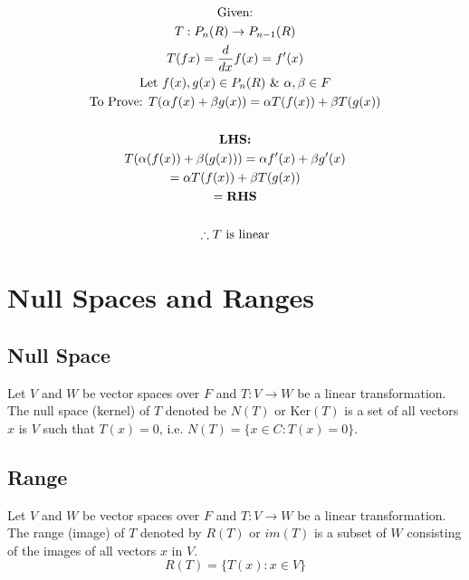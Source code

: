 \documentclass[english,course,fleqn]{lecture}
\newenvironment{qanda}{\begin{enumerate}\setlength{\parindent}{0pt}}{\medskip\end{enumerate}}
\begin{document}
\begin{qanda}
  \begin{gather*}
    \text{Given:}\\
    T:P_{n}(R) \rightarrow P_{n-1}(R)\\
    T(f{x}) = \frac{d}{dx}{f(x)} = f'(x)\\
    \text{Let } f(x), g(x) \in P_{n}(R) ~\&~ \alpha, \beta \in F\\
    \text{To Prove: } T(\alpha f(x) + \beta g(x)) = \alpha T(f(x)) + \beta T(g(x))\\
    \\
    \text{\textbf{LHS:}}\\
    T(\alpha(f(x)) + \beta (g(x))) = \alpha f'(x) + \beta g'(x)\\
    = \alpha T(f(x)) + \beta T(g(x))\\
    = \text{\textbf{RHS}}\\
    \\
    \therefore \text{$T$ is linear}
  \end{gather*}
\end{qanda}

\newpage

\section{Null Spaces and Ranges}

\subsection{Null Space}

\begin{definition}
  Let $V$ and $W$ be vector spaces over $F$ and $T:V\rightarrow W$ be a linear transformation.
  The null space (kernel) of $T$ denoted be $N(T)$ or Ker$(T)$ is a set of all vectors $x$ is $V$
  such that $T(x) = 0$, i.e. $N(T) = \{x \in C:T(x) = 0 \}$.
\end{definition}

\subsection{Range}

\begin{definition}
  Let $V$ and $W$ be vector spaces over $F$ and $T:V\rightarrow W$ be a linear transformation.
  The range (image) of $T$ denoted by $R(T)$ or $im(T)$ is a subset of $W$ consisting of the images
  of all vectors $x$ in $V$.
  \[
    R(T) = \{ T(x): x \in V\}
  \]
\end{definition}
\end{document}
